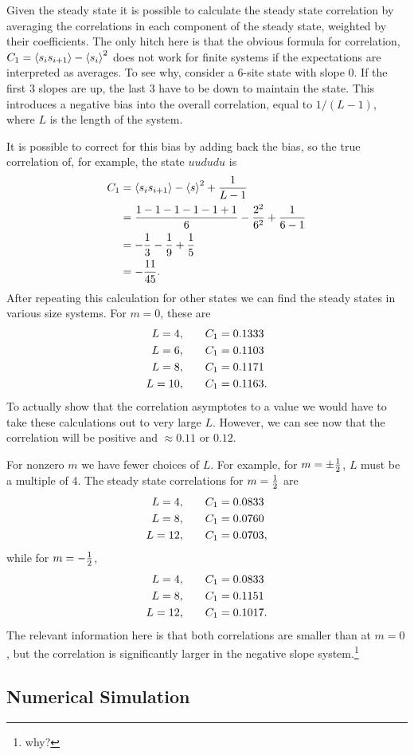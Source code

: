 Given the steady state it is possible to calculate the steady state correlation by averaging the correlations in each component of the steady state, weighted by their coefficients. The only hitch here is that the obvious formula for correlation, $C_1 = \left\langle s_is_{i+1} \right\rangle-\left\langle s_i \right\rangle^2$ does not work for finite systems if the expectations are interpreted as averages.  To see why, consider a 6-site state with slope 0. If the first 3 slopes are up, the last 3 have to be down to maintain the state. This introduces a negative bias into the overall correlation, equal to $1/(L-1)$, where $L$ is the length of the system. 

It is possible to correct for this bias by adding back the bias, so the true correlation of, for example, the state $uududu$ is 
\begin{align}
C_1 &= \left\langle s_is_{i+1} \right\rangle - \left\langle s \right\rangle^2 + \frac{1}{L-1}\nonumber\\
&= \frac{1-1-1-1-1+1}{6} - \frac{2^2}{6^2} + \frac{1}{6-1}\nonumber\\
&= -\frac{1}{3} - \frac{1}{9} + \frac{1}{5}\nonumber\\
&= -\frac{11}{45}.
\end{align}
After repeating this calculation for other states we can find the steady states in various size systems. For $m=0$, these are
\begin{align}
L=4, \qquad &C_1=0.1333\nonumber\\
L=6, \qquad &C_1=0.1103\nonumber\\
L=8, \qquad &C_1=0.1171\nonumber\\
L=10,\qquad &C_1=0.1163.
\end{align}
To actually show that the correlation asymptotes to a value we would have to take these calculations out to very large $L$. However, we can see now that the correlation will be positive and $\approx0.11$ or $0.12$. 

For nonzero $m$ we have fewer choices of $L$. For example, for $m=\pm\frac{1}{2}$, $L$ must be a multiple of 4. The steady state correlations for $m=\frac{1}{2}$ are
\begin{align}
L = 4, \qquad &C_1=0.0833\nonumber\\
L = 8, \qquad &C_1=0.0760\nonumber\\
L =12, \qquad &C_1=0.0703,
\end{align}
while for $m=-\frac{1}{2}$,
\begin{align}
L = 4, \qquad &C_1=0.0833\nonumber\\
L = 8, \qquad &C_1=0.1151\nonumber\\
L =12, \qquad &C_1=0.1017.
\end{align}
The relevant information here is that both correlations are smaller than at $m=0$, but the correlation is significantly larger in the negative slope system.\footnote{why?}

\subsection{Numerical Simulation} \label{sub:num}

